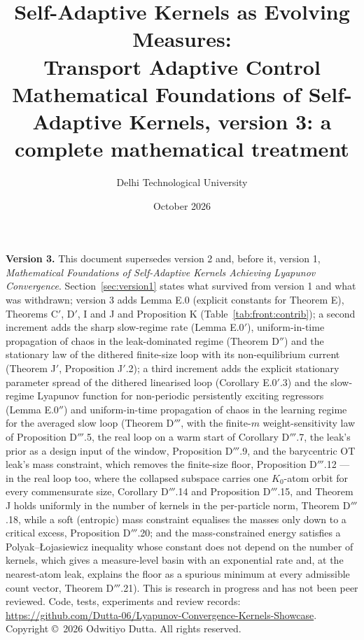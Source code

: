 \documentclass[11pt]{article}
\title{\textbf{Self-Adaptive Kernels as Evolving Measures:\\ Transport Adaptive Control}\\[6pt]
\large Mathematical Foundations of Self-Adaptive Kernels, version 3: a complete mathematical treatment}
\author{Delhi Technological University}
\date{October 2026}
\begin{document}
\maketitle
\thispagestyle{empty}
\begin{center}
\small
\begin{minipage}{0.86\textwidth}
\textbf{Version 3.} This document supersedes version 2 and, before it, version 1, \emph{Mathematical Foundations
of Self-Adaptive Kernels Achieving Lyapunov Convergence}. Section~\ref{sec:version1} states what survived from
version 1 and what was withdrawn; version 3 adds Lemma E.0 (explicit constants for Theorem E), Theorems C$'$, D$'$,
I and J and Proposition K (Table~\ref{tab:front:contrib}); a second increment adds the sharp slow-regime rate
(Lemma E.0$'$), uniform-in-time propagation of chaos in the leak-dominated regime (Theorem D$''$) and the
stationary law of the dithered finite-size loop with its non-equilibrium current (Theorem J$'$,
Proposition J$'$.2); a third increment adds the explicit stationary parameter spread of the dithered linearised loop
(Corollary E.0$'$.3) and the slow-regime Lyapunov function for non-periodic persistently exciting regressors
(Lemma E.0$''$) and uniform-in-time propagation of chaos in the learning regime for the averaged slow loop
(Theorem D$'''$, with the finite-$m$ weight-sensitivity law of Proposition D$'''$.5, the real loop on a warm
start of Corollary D$'''$.7, the leak's prior as a design input of the window, Proposition D$'''$.9, and the
barycentric OT leak's mass constraint, which removes the finite-size floor, Proposition D$'''$.12 --- in the real
loop too, where the collapsed subspace carries one $K_0$-atom orbit for every commensurate size,
Corollary D$'''$.14 and Proposition D$'''$.15, and Theorem J holds uniformly in the number of kernels in the
per-particle norm, Theorem D$'''$.18, while a soft (entropic) mass constraint equalises the masses only down to a
critical excess, Proposition D$'''$.20; and the mass-constrained energy satisfies a Polyak--{\L}ojasiewicz
inequality whose constant does not depend on the number of kernels, which gives a measure-level basin with an
exponential rate and, at the nearest-atom leak, explains the floor as a spurious minimum at every admissible count
vector, Theorem D$'''$.21). This is research in progress
and has not been peer reviewed. Code, tests, experiments and review records:
\url{https://github.com/Dutta-06/Lyapunov-Convergence-Kernels-Showcase}.\\[4pt]
Copyright \copyright\ 2026 Odwitiyo Dutta. All rights reserved.
\end{minipage}
\end{center}
\end{document}
